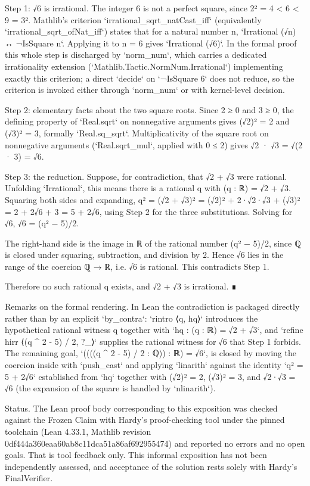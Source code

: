 \documentclass[11pt]{article}
\begin{document}
Step 1: √6 is irrational.
The integer 6 is not a perfect square, since 2² = 4 < 6 < 9 = 3². Mathlib's criterion `irrational\_sqrt\_natCast\_iff` (equivalently `irrational\_sqrt\_ofNat\_iff`) states that for a natural number n, `Irrational (√n) ↔ ¬IsSquare n`. Applying it to n = 6 gives `Irrational (√6)`. In the formal proof this whole step is discharged by `norm\_num`, which carries a dedicated irrationality extension (`Mathlib.Tactic.NormNum.Irrational`) implementing exactly this criterion; a direct `decide` on `¬IsSquare 6` does not reduce, so the criterion is invoked either through `norm\_num` or with kernel-level decision.

Step 2: elementary facts about the two square roots.
Since 2 ≥ 0 and 3 ≥ 0, the defining property of `Real.sqrt` on nonnegative arguments gives
    (√2)² = 2 and (√3)² = 3,
formally `Real.sq\_sqrt`. Multiplicativity of the square root on nonnegative arguments (`Real.sqrt\_mul`, applied with 0 ≤ 2) gives
    √2 · √3 = √(2 · 3) = √6.

Step 3: the reduction.
Suppose, for contradiction, that √2 + √3 were rational. Unfolding `Irrational`, this means there is a rational q with
    (q : ℝ) = √2 + √3.
Squaring both sides and expanding,
    q² = (√2 + √3)² = (√2)² + 2·√2·√3 + (√3)² = 2 + 2√6 + 3 = 5 + 2√6,
using Step 2 for the three substitutions. Solving for √6,
    √6 = (q² − 5)/2.

The right-hand side is the image in ℝ of the rational number (q² − 5)/2, since ℚ is closed under squaring, subtraction, and division by 2. Hence √6 lies in the range of the coercion ℚ → ℝ, i.e. √6 is rational. This contradicts Step 1.

Therefore no such rational q exists, and √2 + √3 is irrational. ∎

Remarks on the formal rendering. In Lean the contradiction is packaged directly rather than by an explicit `by\_contra`: `rintro ⟨q, hq⟩` introduces the hypothetical rational witness q together with `hq : (q : ℝ) = √2 + √3`, and `refine hirr ⟨(q \textasciicircum{} 2 - 5) / 2, ?\_⟩` supplies the rational witness for √6 that Step 1 forbids. The remaining goal, `((((q \textasciicircum{} 2 - 5) / 2 : ℚ)) : ℝ) = √6`, is closed by moving the coercion inside with `push\_cast` and applying `linarith` against the identity `q² = 5 + 2√6` established from `hq` together with (√2)² = 2, (√3)² = 3, and √2·√3 = √6 (the expansion of the square is handled by `nlinarith`).

Status. The Lean proof body corresponding to this exposition was checked against the Frozen Claim with Hardy's proof-checking tool under the pinned toolchain (Lean 4.33.1, Mathlib revision 0df444a360eaa60ab8c11dca51a86af692955474) and reported no errors and no open goals. That is tool feedback only. This informal exposition has not been independently assessed, and acceptance of the solution rests solely with Hardy's FinalVerifier.
\end{document}
